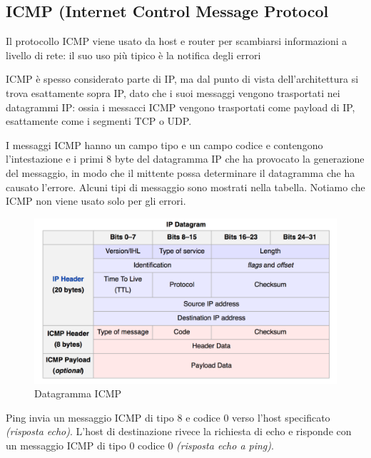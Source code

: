 \documentclass[11pt,a4paper]{article}
\begin{document}
\subsection{ICMP (Internet Control Message Protocol} \label{par: ICMP}
Il protocollo ICMP viene usato da host e router per scambiarsi informazioni a livello di rete: il suo uso più tipico è la notifica degli errori

ICMP è spesso considerato parte di IP, ma dal punto di vista dell'architettura si trova esattamente sopra IP, dato che i suoi messaggi vengono trasportati nei datagrammi IP: ossia i messacci ICMP vengono trasportati come payload di IP, esattamente come i segmenti TCP o UDP.

I messaggi ICMP hanno un campo tipo e un campo codice e contengono l'intestazione e i primi 8 byte del datagramma IP che ha provocato la generazione del messaggio, in modo che il mittente possa determinare il datagramma che ha causato l'errore. Alcuni tipi di messaggio sono mostrati nella tabella. Notiamo che ICMP non viene usato solo per gli errori.
\begin{figure}
	\begin{center}
		\includegraphics[scale=0.23]{img/068.png}
		\caption{Datagramma ICMP}
		\label{fig: 068}
	\end{center}
\end{figure}

Ping invia un messaggio ICMP di tipo 8 e codice 0 verso l'host specificato \textit{(risposta echo)}. L'host di destinazione rivece la richiesta di echo e risponde con un messaggio ICMP di tipo 0 codice 0 \textit{(risposta echo a ping)}.
\end{document}

